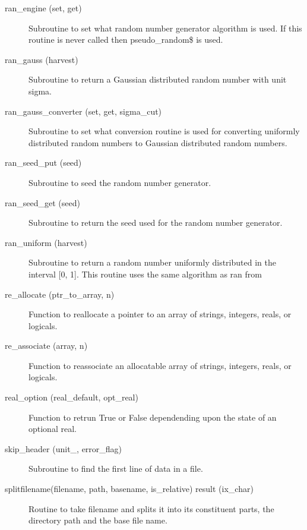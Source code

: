 \begin{description}
\item[ran_engine (set, get)] \Newline 
Subroutine to set what random number generator algorithm is used.
If this routine is never called then pseudo_random\$ is used.

\item[ran_gauss (harvest)] \Newline 
Subroutine to return a Gaussian distributed random number with unit sigma.

\item[ran_gauss_converter (set, get, sigma_cut)] \Newline 
Subroutine to set what conversion routine is used for converting
uniformly distributed random numbers to Gaussian distributed random numbers.

\item[ran_seed_put (seed)] \Newline 
Subroutine to seed the random number generator. 

\item[ran_seed_get (seed)] \Newline 
Subroutine to return the seed used for the random number generator.

\item[ran_uniform (harvest)] \Newline 
Subroutine to return a random number uniformly distributed in the 
interval [0, 1]. This routine uses the same algorithm as ran from

\item[re_allocate (ptr_to_array, n)] \Newline 
Function to reallocate a pointer to an array of strings, integers, reals, or logicals.

\item[re_associate (array, n)] \Newline 
Function to reassociate an allocatable array of strings, integers, reals, or logicals.

\item[real_option (real_default, opt_real)] \Newline 
Function to retrun True or False dependending upon the state of an 
optional real.

\item[skip_header (unit_, error_flag)] \Newline 
Subroutine to find the first line of data in a file. 

\item[splitfilename(filename, path, basename, is_relative) result (ix_char)] \Newline 
Routine to take filename and splits it into its constituent parts, 
the directory path and the base file name.  


\end{description}

